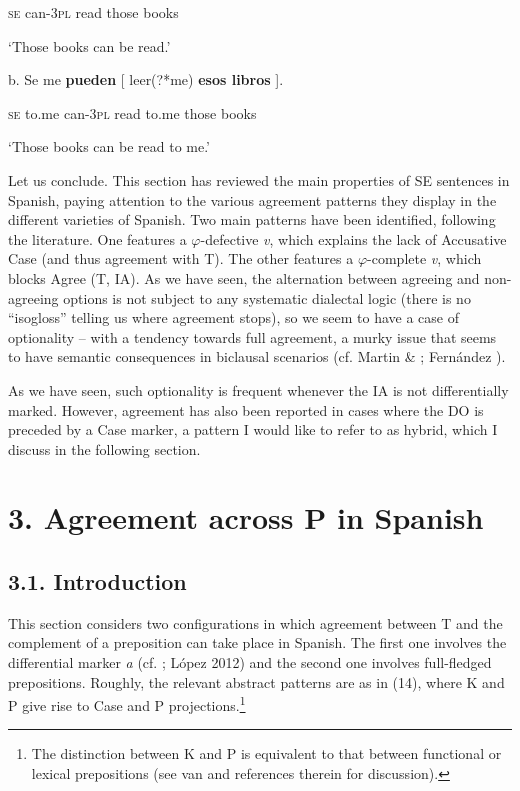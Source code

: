 \documentclass[output=paper]{langsci/langscibook}
\begin{document}
                  \textsc{se} can\textsc{{}-3pl}   read  those  books

        ‘Those books can be read.’

  b.   Se   me      \textbf{pueden}  [ leer(?*me)    \textbf{esos    libros} ].

         \textsc{se} to.me  can\textsc{{}-3pl}    read   to.me  those  books

         ‘Those books can be read to me.’

Let us conclude. This section has reviewed the main properties of SE sentences in Spanish, paying attention to the various agreement patterns they display in the different varieties of Spanish. Two main patterns have been identified, following the literature. One features a $\varphi $-defective \textit{v}, which explains the lack of Accusative Case (and thus agreement with T). The other features a $\varphi $-complete \textit{v}, which blocks Agree (T, IA). As we have seen, the alternation between agreeing and non-agreeing options is not subject to any systematic dialectal logic (there is no “isogloss” telling us where agreement stops), so we seem to have a case of optionality – with a tendency towards full agreement, a murky issue that seems to have semantic consequences in biclausal scenarios (cf. Martin \& \citealt{Uriagereka1998}; Fernández \citealt{Serrano2016}). 

  As we have seen, such optionality is frequent whenever the IA is not differentially marked. However, agreement has also been reported in cases where the DO is preceded by a Case marker, a pattern I would like to refer to as hybrid, which I discuss in the following section.

\section{ 3. Agreement across P in Spanish} 

\subsection{ 3.1. Introduction}

This section considers two configurations in which agreement between T and the complement of a preposition can take place in Spanish. The first one involves the differential marker \textit{a} (cf. \citealt{Torrego1998}; López 2012) and the second one involves full-fledged prepositions. Roughly, the relevant abstract patterns are as in (14), where K and P give rise to Case and P projections.\footnote{The distinction between K and P is equivalent to that between functional or lexical prepositions (see van \citealt{Riemsdijk1990} and references therein for discussion).}
\end{document}

